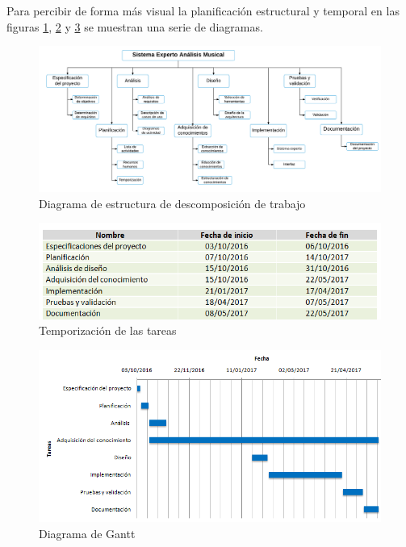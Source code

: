 Para percibir de forma más visual la planificación estructural y temporal en las figuras \ref{fig1.4.1}, \ref{fig1.4.2} y \ref{fig1.4.3} se muestran una serie de diagramas.

\begin{figure}[H]
	\centering
	\hspace*{-1.2in}
	\includegraphics[scale=0.5]{imagenes/diagrama_edt.png}
	\caption{Diagrama de estructura de descomposición de trabajo}
	\label{fig1.4.1}
\end{figure}

\begin{figure}[H]
	\centering
	\hspace*{-0.6in}
	\includegraphics[scale=0.7]{imagenes/diagrama_tareas.png}
	\caption{Temporización de las tareas}
	\label{fig1.4.2}
\end{figure}

\bigskip
\bigskip

\begin{figure}[H]
	\centering
	\hspace*{-0.6in}
	\includegraphics[scale=0.80]{imagenes/diagrama_gantt.png}
	\caption{Diagrama de Gantt}
	\label{fig1.4.3}
\end{figure}